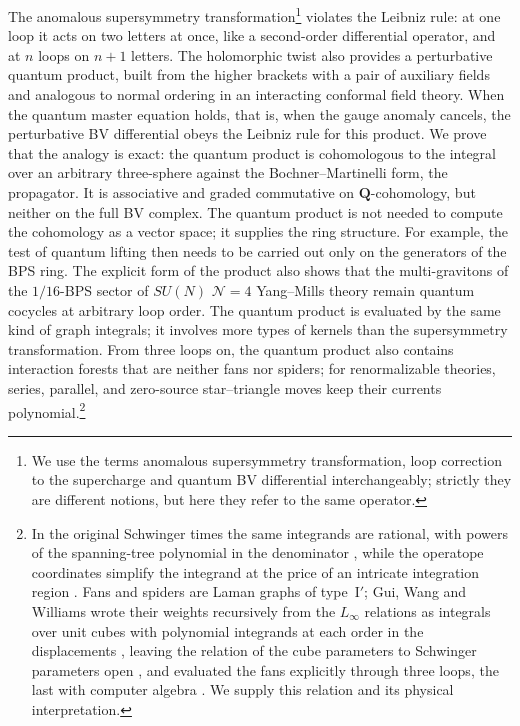 \documentclass[11pt]{article}
\numberwithin{equation}{section}
\numberwithin{figure}{section}
\numberwithin{table}{section}
\begin{document}
The anomalous supersymmetry transformation\footnote{We use the terms anomalous supersymmetry transformation, loop correction to the supercharge and quantum BV differential interchangeably; strictly they are different notions, but here they refer to the same operator.} violates the Leibniz rule: at one loop it acts on two letters at once, like a second-order differential operator, and at $n$ loops on $n+1$ letters. The holomorphic twist also provides a perturbative quantum product, built from the higher brackets with a pair of auxiliary fields \cite{higher} and analogous to normal ordering in an interacting conformal field theory. When the quantum master equation holds, that is, when the gauge anomaly cancels, the perturbative BV differential obeys the Leibniz rule for this product. We prove that the analogy is exact: the quantum product is cohomologous to the integral over an arbitrary three-sphere against the Bochner--Martinelli form, the propagator. It is associative and graded commutative on $\mathbf Q$-cohomology, but neither on the full BV complex. The quantum product is not needed to compute the cohomology as a vector space; it supplies the ring structure. For example, the test of quantum lifting \cite[Section 1]{semichiral} then needs to be carried out only on the generators of the BPS ring. The explicit form of the product also shows that the multi-gravitons of the $1/16$-BPS sector of $SU(N)$ $\mathcal N=4$ Yang--Mills theory remain quantum cocycles at arbitrary loop order. The quantum product is evaluated by the same kind of graph integrals; it involves more types of kernels than the supersymmetry transformation. From three loops on, the quantum product also contains interaction forests that are neither fans nor spiders; for renormalizable theories, series, parallel, and zero-source star--triangle moves keep their currents polynomial.\footnote{In the original Schwinger times the same integrands are rational, with powers of the spanning-tree polynomial in the denominator \cite[Corollaries 1--2 and proof of Theorem 6]{Wang}, while the operatope coordinates simplify the integrand at the price of an intricate integration region \cite[Sections 2.3 and 2.6]{operatope}. Fans and spiders are Laman graphs of type~I$'$; Gui, Wang and Williams wrote their weights recursively from the $L_\infty$ relations as integrals over unit cubes with polynomial integrands at each order in the displacements \cite[Theorem 4.13]{GWW}, leaving the relation of the cube parameters to Schwinger parameters open \cite[Remark 4.14]{GWW}, and evaluated the fans explicitly through three loops, the last with computer algebra \cite[Sections 4.4--4.6]{GWW}. We supply this relation and its physical interpretation.}
\end{document}
